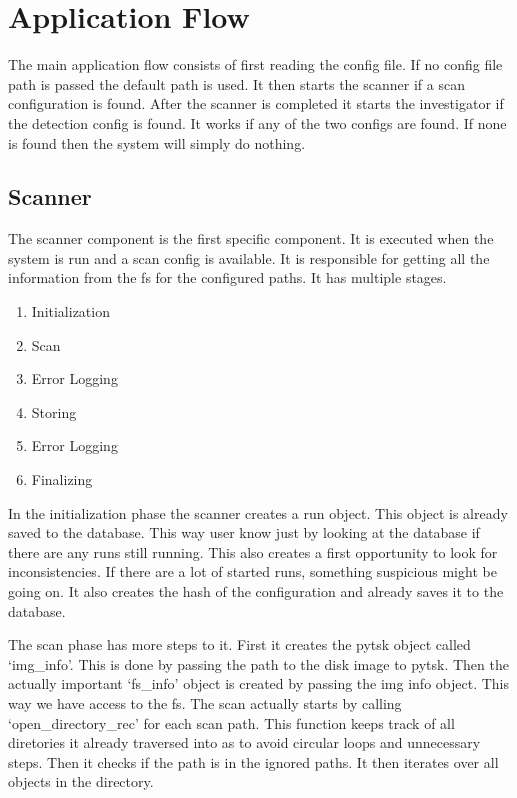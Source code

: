 
\section{Application Flow}
\label{sec:flow}

The main application flow consists of first reading the config file. If no config file path is passed the default path is used. It then starts the scanner if a scan configuration is found. After the scanner is completed it starts the investigator if the detection config is found. It works if any of the two configs are found. If none is found then the system will simply do nothing. 


\subsection{Scanner}
\label{sec:Scanner}

The scanner component is the first specific component. It is executed when the system is run and a scan config is available. It is responsible for getting all the information from the \gls{fs} for the configured paths. It has multiple stages.

\begin{enumerate}
	\item Initialization
	\item Scan
	\item Error Logging
	\item Storing
	\item Error Logging
	\item Finalizing
\end{enumerate}

In the initialization phase the scanner creates a run object. This object is already saved to the database. This way user know just by looking at the database if there are any runs still running. This also creates a first opportunity to look for inconsistencies. If there are a lot of started runs, something suspicious might be going on. It also creates the hash of the configuration and already saves it to the database.

The scan phase has more steps to it. First it creates the \gls{pytsk} object called `img\_info'. This is done by passing the path to the disk image to \gls{pytsk}. Then the actually important `fs\_info' object is created by passing the img info object. This way we have access to the \gls{fs}. The scan actually starts by calling `open\_directory\_rec' for each scan path. This function keeps track of all diretories it already traversed into as to avoid circular loops and unnecessary steps. Then it checks if the path is in the ignored paths. It then iterates over all objects in the directory. 

